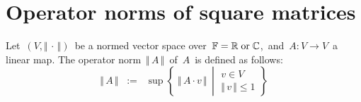 

\section{Operator norms of square matrices}
\setcounter{theorem}{0}
\setcounter{equation}{0}


\renewcommand{\theenumi}{\roman{enumi}}
\renewcommand{\labelenumi}{\textnormal{(\theenumi)}$\;\;$}


\begin{definition}
\mbox{}
\vskip 0.1cm
\noindent
Let \,$(V,\Vert\,\cdot\,\Vert)$\, be a normed vector space over \,$\mathbb{F} = \mathbb{R} \;\textnormal{or}\; \mathbb{C}$,\,
and \,$A : V \longrightarrow V$\, a linear map.
The operator norm \,$\Vert\,A\,\Vert$\, of \,$A$\, is defined as follows:
\begin{equation*}
\Vert\,A\,\Vert
\;\; := \;\;
	\sup\left\{\;
		\Vert\, A \cdot v \,\Vert
		\,\;\left\vert\;
			\begin{array}{c}
			v \in V
			\\
			\Vert\, v \,\Vert \leq 1
			\end{array}
			\right. 
		\right\}
\end{equation*}
\end{definition}

